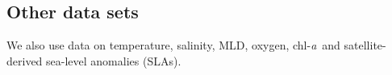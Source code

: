 \documentclass[authoryear,review,11pt]{elsarticle}
\newcommand{\chla}{chl-{\emph{a}}}
\begin{document}



\subsection{Other data sets}
\label{sec:data.misc}

We also use data on temperature, salinity, MLD, oxygen, \chla\, and satellite-derived sea-level anomalies (SLAs).
\end{document}
